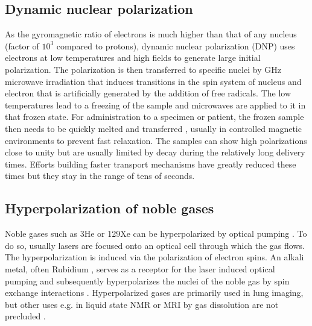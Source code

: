         \subsection{Dynamic nuclear polarization}
        As the gyromagnetic ratio of electrons is much higher than that of any nucleus (factor of $10^{3}$ compared to protons), dynamic nuclear polarization (DNP) uses electrons at low temperatures and high fields to generate large initial polarization\cite{berliner_spin_1976}. The polarization is then transferred to specific nuclei by \si{\giga\hertz} microwave irradiation \cite{bajaj_dynamic_2011} that induces transitions in the spin system of nucleus and electron that is artificially generated by the addition of free radicals. The low temperatures lead to a freezing of the sample and microwaves are applied to it in that frozen state. For administration to a specimen or patient, the frozen sample then needs to be quickly melted and transferred \cite{johannesson_dynamic_2009}, usually in controlled magnetic environments \cite{} to prevent fast relaxation. The samples can show high polarizations close to unity but are usually limited by decay during the relatively long delivery times. Efforts building faster transport mechanisms have greatly reduced these times but they stay in the range of tens of seconds.
        \subsection{Hyperpolarization of noble gases}
        Noble gases such as 3He or 129Xe can be hyperpolarized by optical pumping \cite{middleton_mr_1995,oros_hyperpolarized_2004}. To do so, usually lasers are focused onto an optical cell through which the gas flows. The hyperpolarization is induced via the polarization of electron spins. An alkali metal, often Rubidium \cite{hersman_large_2008}, serves as a receptor for the laser induced optical pumping and subsequently hyperpolarizes the nuclei of the noble gas by spin exchange interactions \cite{walker_spin-exchange_1997}. Hyperpolarized gases are primarily used in lung imaging, but other uses e.g. in liquid state NMR or MRI by gas dissolution are not precluded \cite{duhamel_xenon-129_2001}.
